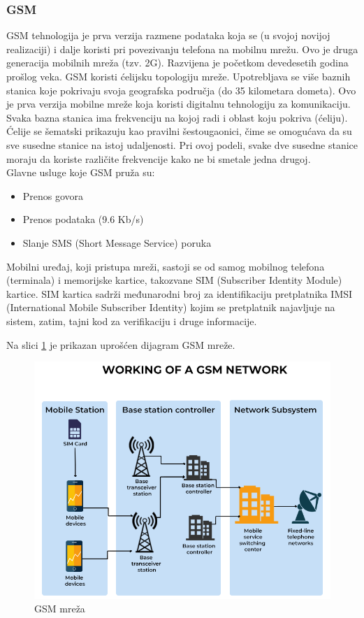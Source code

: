 \documentclass[a4paper]{article}
\begin{document}
        \subsubsection{GSM}
GSM tehnologija je prva verzija razmene podataka koja se (u svojoj novijoj realizaciji) i dalje koristi pri povezivanju telefona na mobilnu mrežu. Ovo je druga generacija mobilnih mreža (tzv. 2G). Razvijena je početkom devedesetih godina prošlog veka.
GSM koristi ćelijsku topologiju mreže. Upotrebljava se više baznih stanica koje pokrivaju svoja geografska područja (do 35 kilometara dometa). Ovo je prva verzija mobilne mreže koja koristi digitalnu tehnologiju za komunikaciju.
Svaka bazna stanica ima frekvenciju na kojoj radi i oblast koju pokriva (ćeliju). Ćelije se šematski prikazuju kao pravilni šestougaonici, čime se omogućava da su sve susedne stanice na istoj udaljenosti. Pri ovoj podeli, svake dve susedne stanice moraju da koriste različite frekvencije kako ne bi smetale jedna drugoj. \\
Glavne usluge koje GSM pruža su:
\begin{itemize}
    \item Prenos govora
    \item Prenos podataka (9.6 Kb/s)
    \item Slanje SMS (Short Message Service) poruka
\end{itemize}
Mobilni uređaj, koji pristupa mreži,  sastoji se od samog mobilnog telefona (terminala) i memorijske kartice, takozvane SIM (Subscriber Identity Module) kartice. SIM kartica sadrži međunarodni broj za identifikaciju pretplatnika IMSI (International Mobile Subscriber Identity) kojim se pretplatnik najavljuje na sistem, zatim, tajni kod za verifikaciju i druge informacije.

Na slici \ref{fig:GSM} je prikazan uprošćen dijagram GSM mreže.

\begin{figure}[!ht]
\begin{center}
\includegraphics[scale=0.35]{GSM.png}
\end{center}
\caption{GSM mreža \cite{GSM}}
\label{fig:GSM}
\end{figure}
\newpage
\end{document}
